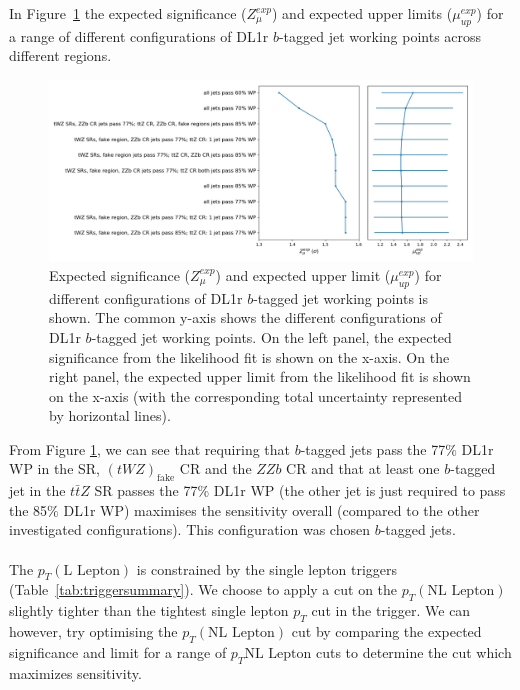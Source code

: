 In Figure~\ref{fig:4lep-btagWP-optimization} the expected significance ($Z_{\mu}^{exp}$) and expected upper limits ($\mu_{up}^{exp}$) for a range of different configurations of DL1r $b$-tagged jet working points across different regions.
\begin{figure}[h!]
	\includegraphics[width = 1\textwidth]{figures/btagWP_optimization.png}
  \centering
	\caption{Expected significance ($Z_{\mu}^{exp}$) and expected upper limit ($\mu_{up}^{exp}$) for different configurations of DL1r $b$-tagged jet working points is shown. The common y-axis shows the different configurations of DL1r $b$-tagged jet working points. On the left panel, the expected significance from the likelihood fit is shown on the x-axis. On the right panel, the expected upper limit from the likelihood fit is shown on the x-axis (with the corresponding total uncertainty represented by horizontal lines).}
	\label{fig:4lep-btagWP-optimization}
\end{figure}


From Figure \ref{fig:4lep-btagWP-optimization}, we can see that requiring that $b$-tagged jets pass the 77$\%$ DL1r WP in the \tWZ SR, $(tWZ)_{\text{fake}}$ CR and the $ZZb$ CR and that at least one $b$-tagged jet in the $t\bar{t}Z$ SR passes the 77$\%$ DL1r WP (the other jet is just required to pass the 85$\%$ DL1r WP) maximises the sensitivity overall (compared to the other investigated configurations). This configuration was chosen $b$-tagged jets.\\\\

The $p_{T}(\text{L Lepton})$ is constrained by the single lepton triggers (Table~\ref{tab:triggersummary}). We choose to apply a cut on the $p_{T}(\text{NL Lepton})$ slightly tighter than the tightest single lepton $p_{T}$ cut in the trigger. We can however, try optimising the $p_{T}(\text{NL Lepton})$ cut by comparing the expected significance and limit for a range of $p_{T}{\text{NL Lepton}}$ cuts to determine the cut which maximizes sensitivity.\\\\


